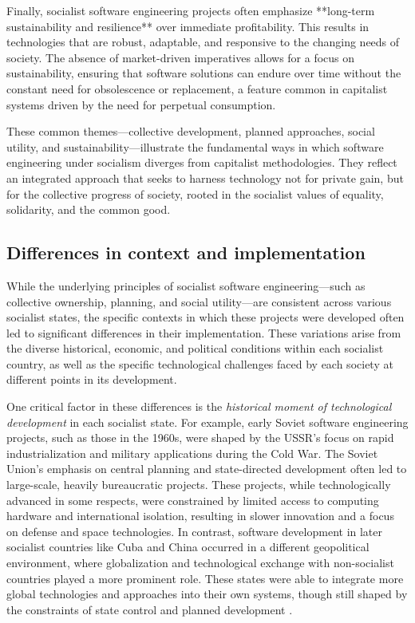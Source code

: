 \begin{refsection}
Finally, socialist software engineering projects often emphasize **long-term sustainability and resilience** over immediate profitability. This results in technologies that are robust, adaptable, and responsive to the changing needs of society. The absence of market-driven imperatives allows for a focus on sustainability, ensuring that software solutions can endure over time without the constant need for obsolescence or replacement, a feature common in capitalist systems driven by the need for perpetual consumption.

These common themes—collective development, planned approaches, social utility, and sustainability—illustrate the fundamental ways in which software engineering under socialism diverges from capitalist methodologies. They reflect an integrated approach that seeks to harness technology not for private gain, but for the collective progress of society, rooted in the socialist values of equality, solidarity, and the common good.

\subsection{Differences in context and implementation}

While the underlying principles of socialist software engineering—such as collective ownership, planning, and social utility—are consistent across various socialist states, the specific contexts in which these projects were developed often led to significant differences in their implementation. These variations arise from the diverse historical, economic, and political conditions within each socialist country, as well as the specific technological challenges faced by each society at different points in its development.

One critical factor in these differences is the \textit{historical moment of technological development} in each socialist state. For example, early Soviet software engineering projects, such as those in the 1960s, were shaped by the USSR's focus on rapid industrialization and military applications during the Cold War. The Soviet Union's emphasis on central planning and state-directed development often led to large-scale, heavily bureaucratic projects. These projects, while technologically advanced in some respects, were constrained by limited access to computing hardware and international isolation, resulting in slower innovation and a focus on defense and space technologies. In contrast, software development in later socialist countries like Cuba and China occurred in a different geopolitical environment, where globalization and technological exchange with non-socialist countries played a more prominent role. These states were able to integrate more global technologies and approaches into their own systems, though still shaped by the constraints of state control and planned development \cite[pp.~110-114]{kapcia2008}.


\end{refsection}
